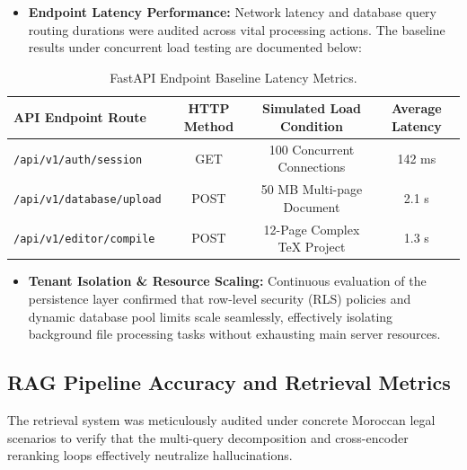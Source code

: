\begin{itemize}
    \item \textbf{Endpoint Latency Performance:} Network latency and database query routing durations were audited across vital processing actions. The baseline results under concurrent load testing are documented below:
\end{itemize}

\begin{table}[H]
\centering
\caption{FastAPI Endpoint Baseline Latency Metrics.}
\label{tab:latency_metrics}
\renewcommand{\arraystretch}{1.3} %
\begin{tabular}{@{}l c c c@{}}
\toprule
\textbf{API Endpoint Route} & \textbf{HTTP Method} & \textbf{Simulated Load Condition} & \textbf{Average Latency} \\ 
\midrule
\texttt{/api/v1/auth/session}  & GET  & 100 Concurrent Connections & 142 ms  \\ 
\texttt{/api/v1/database/upload} & POST & 50 MB Multi-page Document  & 2.1 s \\ 
\texttt{/api/v1/editor/compile}  & POST & 12-Page Complex TeX Project & 1.3 s \\ 
\bottomrule
\end{tabular}
\end{table}

\begin{itemize}
    \item \textbf{Tenant Isolation \& Resource Scaling:} Continuous evaluation of the persistence layer confirmed that row-level security (RLS) policies and dynamic database pool limits scale seamlessly, effectively isolating background file processing tasks without exhausting main server resources.
\end{itemize}

\subsection{RAG Pipeline Accuracy and Retrieval Metrics}
The retrieval system was meticulously audited under concrete Moroccan legal scenarios to verify that the multi-query decomposition and cross-encoder reranking loops effectively neutralize hallucinations.

